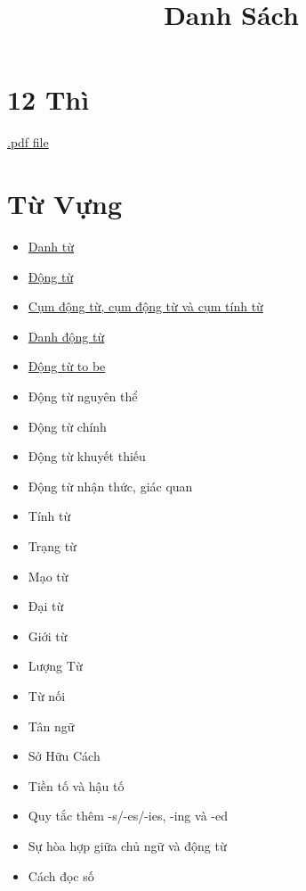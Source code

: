 \title{\Huge \textbf{Danh Sách}}
\maketitle
\tableofcontents

\chapter{12 Thì}
\href{https://github.com/theslime016/english-project/blob/main/english-project-release-files/12Tenses.pdf}
{.pdf file}
\chapter{Từ Vựng}
\begin{multicols*}{2}
    \begin{itemize}
        \item \href{https://github.com/theslime016/english-project/blob/main/english-project-release-files/Noun.pdf}{Danh từ}
        \item \href{https://github.com/theslime016/english-project/blob/main/english-project-release-files/Verb.pdf}{Động từ}
        \item \href{https://github.com/theslime016/english-project/blob/main/english-project-release-files/Phrasal.pdf}{Cụm động từ, cụm động từ và cụm tính từ}
        \item \href{https://github.com/theslime016/english-project/blob/main/english-project-release-files/Gerunds.pdf}{Danh động từ}
        \item \href{https://github.com/theslime016/english-project/blob/main/english-project-release-files/To%20be%20Verbs.pdf}{Động từ to be}
        \item Động từ nguyên thể
        \item Động từ chính
        \item Động từ khuyết thiếu
        \item Động từ nhận thức, giác quan
        \item Tính từ
        \item Trạng từ
        \item Mạo từ
        \item Đại từ
        \item Giới từ
        \item Lượng Từ
        \item Từ nối
        \item Tân ngữ
        \item Sở Hữu Cách
        \item Tiền tố và hậu tố
        \item Quy tắc thêm -s/-es/-ies, -ing và -ed
        \item Sự hòa hợp giữa chủ ngữ và động từ
        \item Cách đọc số
    \end{itemize}
\end{multicols*}

